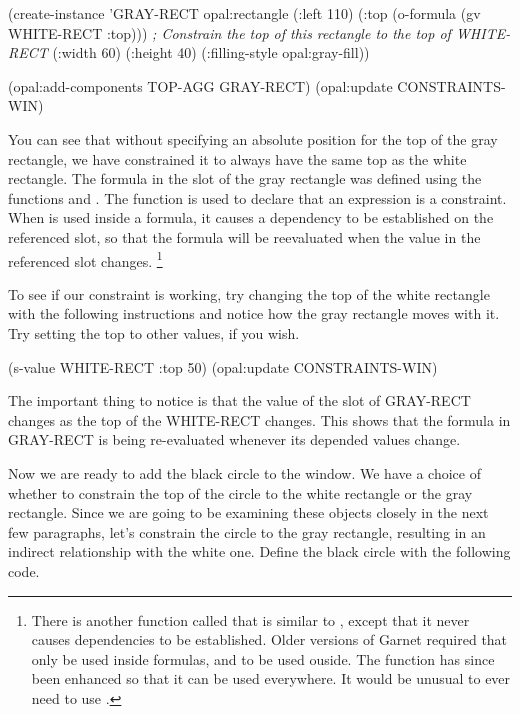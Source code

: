 \begin{programexample}
(create-instance 'GRAY-RECT opal:rectangle
   (:left 110)
   (:top (o-formula (gv WHITE-RECT :top)))  {\it ; Constrain the top of this rectangle to the top of WHITE-RECT}
   (:width 60) (:height 40)
   (:filling-style opal:gray-fill))

(opal:add-components TOP-AGG GRAY-RECT)
(opal:update CONSTRAINTS-WIN)
\end{programexample}

You can see that without specifying an absolute position for the top
of the gray rectangle, we have constrained it to always have the same
top as the white rectangle.  The formula in the  slot of
the gray rectangle was defined using the functions  and
.  The  function is used to declare that an
expression is a constraint.  When  is used inside a formula,
it causes a dependency to be established on the referenced slot, so that
the formula will be reevaluated when the value in the referenced slot
changes.  \footnote{There is another function called 
that is similar
to , except that it never causes dependencies to be established.
Older versions of Garnet required that  only be used inside
formulas, and  to be used ouside.  The  function has
since been enhanced so that it can be used everywhere.  It would be
unusual to ever need to use .}

To see if our constraint is working, try changing the
top of the white rectangle with the following instructions and notice
how the gray rectangle moves with it.  Try setting the top to other
values, if you wish.

\begin{programexample}
(s-value WHITE-RECT :top 50)
(opal:update CONSTRAINTS-WIN)
\end{programexample}

The important thing to notice is that the value of the  slot
of GRAY-RECT changes as the top of the WHITE-RECT changes.  This shows
that the formula in GRAY-RECT is being re-evaluated whenever its
depended values change.

Now we are ready to add the black circle to the window.  We have a
choice of whether to constrain the top of the circle to the white
rectangle or the gray rectangle.  Since we are going to be examining
these objects closely in the next few paragraphs, let's constrain the
circle to the gray rectangle, resulting in an indirect relationship with
the white one.  Define the black circle with the following code.

